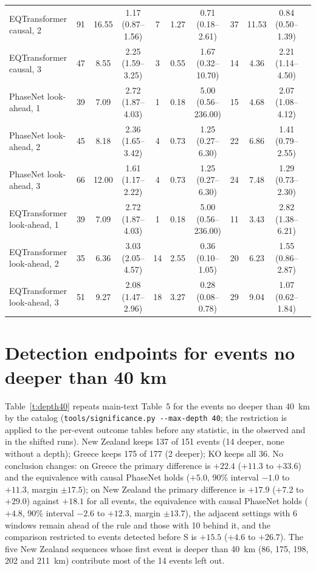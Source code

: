 \documentclass[11pt,a4paper]{article}
\newcommand{\tool}[1]{\nolinkurl{#1}}
\begin{document}
\begin{table}[htbp]
{\begin{tabular}{@{}lcccccccccc@{}}
    EQTransformer causal, 2 & 91 & 16.55 & 1.17 (0.87--1.56) & 7 & 1.27 & 0.71 (0.18--2.61) & 37 & 11.53 & 0.84 (0.50--1.39) \\
    EQTransformer causal, 3 & 47 & 8.55 & 2.25 (1.59--3.25) & 3 & 0.55 & 1.67 (0.32--10.70) & 14 & 4.36 & 2.21 (1.14--4.50) \\
    PhaseNet look-ahead, 1 & 39 & 7.09 & 2.72 (1.87--4.03) & 1 & 0.18 & 5.00 (0.56--236.00) & 15 & 4.68 & 2.07 (1.08--4.12) \\
    PhaseNet look-ahead, 2 & 45 & 8.18 & 2.36 (1.65--3.42) & 4 & 0.73 & 1.25 (0.27--6.30) & 22 & 6.86 & 1.41 (0.79--2.55) \\
    PhaseNet look-ahead, 3 & 66 & 12.00 & 1.61 (1.17--2.22) & 4 & 0.73 & 1.25 (0.27--6.30) & 24 & 7.48 & 1.29 (0.73--2.30) \\
    EQTransformer look-ahead, 1 & 39 & 7.09 & 2.72 (1.87--4.03) & 1 & 0.18 & 5.00 (0.56--236.00) & 11 & 3.43 & 2.82 (1.38--6.21) \\
    EQTransformer look-ahead, 2 & 35 & 6.36 & 3.03 (2.05--4.57) & 14 & 2.55 & 0.36 (0.10--1.05) & 20 & 6.23 & 1.55 (0.86--2.87) \\
    EQTransformer look-ahead, 3 & 51 & 9.27 & 2.08 (1.47--2.96) & 18 & 3.27 & 0.28 (0.08--0.78) & 29 & 9.04 & 1.07 (0.62--1.84) \\
    \bottomrule
  \end{tabular}}
\end{table}

\clearpage
\section{Detection endpoints for events no deeper than 40 km}\label{s:depth40}

Table~\ref{t:depth40} repeats main-text Table~5 for the events no deeper than 40~km
by the catalog (\tool{tools/significance.py --max-depth 40}; the restriction is
applied to the per-event outcome tables before any statistic, in the observed and in
the shifted runs). New Zealand keeps 137 of 151 events (14 deeper, none without a
depth); Greece keeps 175 of 177 (2 deeper); KO keeps all 36. No conclusion changes: on Greece the primary difference is $+22.4$ ($+11.3$ to $+33.6$) and the equivalence with causal PhaseNet holds ($+5.0$, 90\% interval $-1.0$ to $+11.3$, margin $\pm 17.5$); on New Zealand the
primary difference is $+17.9$ ($+7.2$ to $+29.0$) against $+18.1$ for all events,
the equivalence with causal PhaseNet holds ($+4.8$, 90\% interval $-2.6$ to $+12.3$,
margin $\pm 13.7$), the adjacent settings with 6 windows remain ahead of the rule and
those with 10 behind it, and the comparison restricted to events detected before S is
$+15.5$ ($+4.6$ to $+26.7$). The five New Zealand sequences whose first event is
deeper than 40~km (86, 175, 198, 202 and 211~km) contribute most of the 14 events left
out.
\end{document}
